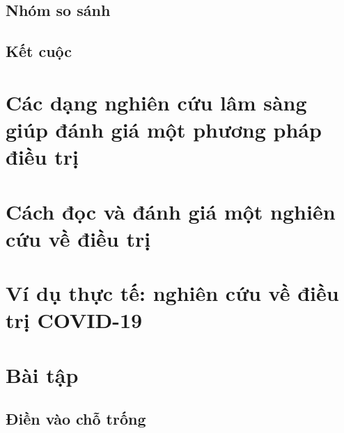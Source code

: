 \documentclass[
]{book}
\begin{document}
\hypertarget{nhuxf3m-so-suxe1nh}{%
\subsection{Nhóm so sánh}\label{nhuxf3m-so-suxe1nh}}

\hypertarget{kux1ebft-cuux1ed9c}{%
\subsection{Kết cuộc}\label{kux1ebft-cuux1ed9c}}

\hypertarget{cuxe1c-dux1ea1ng-nghiuxean-cux1ee9u-luxe2m-suxe0ng-giuxfap-ux111uxe1nh-giuxe1-mux1ed9t-phux1b0ux1a1ng-phuxe1p-ux111iux1ec1u-trux1ecb}{%
\section{Các dạng nghiên cứu lâm sàng giúp đánh giá một phương pháp điều trị}\label{cuxe1c-dux1ea1ng-nghiuxean-cux1ee9u-luxe2m-suxe0ng-giuxfap-ux111uxe1nh-giuxe1-mux1ed9t-phux1b0ux1a1ng-phuxe1p-ux111iux1ec1u-trux1ecb}}

\hypertarget{cuxe1ch-ux111ux1ecdc-vuxe0-ux111uxe1nh-giuxe1-mux1ed9t-nghiuxean-cux1ee9u-vux1ec1-ux111iux1ec1u-trux1ecb}{%
\section{Cách đọc và đánh giá một nghiên cứu về điều trị}\label{cuxe1ch-ux111ux1ecdc-vuxe0-ux111uxe1nh-giuxe1-mux1ed9t-nghiuxean-cux1ee9u-vux1ec1-ux111iux1ec1u-trux1ecb}}

\hypertarget{vuxed-dux1ee5-thux1ef1c-tux1ebf-nghiuxean-cux1ee9u-vux1ec1-ux111iux1ec1u-trux1ecb-covid-19}{%
\section{Ví dụ thực tế: nghiên cứu về điều trị COVID-19}\label{vuxed-dux1ee5-thux1ef1c-tux1ebf-nghiuxean-cux1ee9u-vux1ec1-ux111iux1ec1u-trux1ecb-covid-19}}

\hypertarget{buxe0i-tux1eadp}{%
\section{Bài tập}\label{buxe0i-tux1eadp}}

\hypertarget{ux111iux1ec1n-vuxe0o-chux1ed7-trux1ed1ng}{%
\subsection{Điền vào chỗ trống}\label{ux111iux1ec1n-vuxe0o-chux1ed7-trux1ed1ng}}
\end{document}
